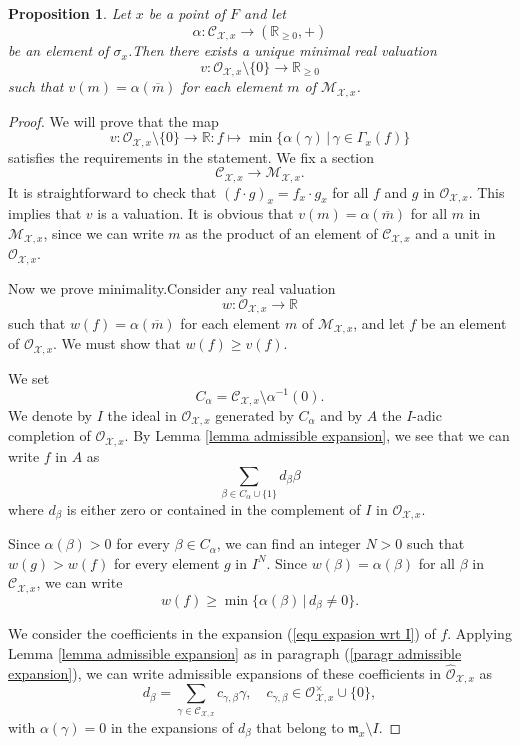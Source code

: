 \documentclass{amsart}%
\numberwithin{equation}{subsection}
\theoremstyle{plain2}
\newtheorem{prop}[equation]{Proposition}
\theoremstyle{definition2}
\theoremstyle{stepstyle}
\theoremstyle{point}
\theoremstyle{subpoint}
\newcommand{\R}{\ensuremath{\mathbb{R}}}
\newcommand{\cX}{\ensuremath{\mathscr{X}}}
\newcommand{\caC}{\ensuremath{\mathcal{C}}}
\newcommand{\caO}{\ensuremath{\mathcal{O}}}
\renewcommand{\R}{\ensuremath{\mathbb{R}}}
\begin{document}
\begin{prop}\label{prop-val}
Let $x$ be a point of $F$ and let $$\alpha:\mathcal{C}_{\cX,x}\to (\R_{\geq 0},+)$$ be an element of $\sigma_x$.Then there exists a unique minimal real valuation $$v:\mathcal{O}_{\cX,x} \setminus \{0\}\to \R_{\geq 0}$$ such that $v(m)=\alpha(\overline{m})$ for each element $m$ of $\mathcal{M}_{\cX,x}$.
\end{prop}
\begin{proof}
We will prove that the map
\begin{equation}\label{eq:val}
v:\mathcal{O}_{\cX,x} \setminus \{0\}\to \R:f\mapsto
\min\{\alpha(\gamma)\,|\,\gamma\in \Gamma_x(f)\}\end{equation}
satisfies the requirements in the statement. We fix a section $$\mathcal{C}_{\cX,x}\to \mathcal{M}_{\cX,x}.$$
It is straightforward to check that $(f\cdot g)_x=f_x\cdot g_x$ for all $f$ and $g$ in $\mathcal{O}_{\cX,x}$. This implies that $v$ is a valuation. It is obvious that
$v(m)=\alpha(\overline{m})$ for all $m$ in $\mathcal{M}_{\cX,x}$, since we can write $m$ as the product of an element of $\mathcal{C}_{\cX,x}$ and a unit in $\mathcal{O}_{\cX,x}$.

Now we prove minimality.Consider any real valuation $$w:\mathcal{O}_{\cX,x}\to \R$$ such that $w(f)=\alpha(\overline{m})$ for each element $m$ of
$\mathcal{M}_{\cX,x}$, and let $f$ be an element of
$\mathcal{O}_{\cX,x}$. We must show that $w(f)\geq v(f)$.

We set $$C_{\alpha}=\mathcal{C}_{\cX,x}\setminus \alpha^{-1}(0).$$ We denote by $I$ the ideal in $\mathcal{O}_{\cX,x}$ generated by $C_{\alpha}$ and by $A$ the $I$-adic completion of $\mathcal{O}_{\cX,x}$. By Lemma \ref{lemma admissible expansion}, we see that we can write $f$ in $A$ as \begin{equation} \label{equ expasion wrt I}
\sum_{\beta \in C_{\alpha}\cup\{1\}}d_\beta \beta
\end{equation} where $d_\beta$ is either zero or contained in the complement of $I$ in $\mathcal{O}_{\cX,x}$.

Since $\alpha(\beta)>0$ for every $\beta\in C_{\alpha}$, we can find an integer $N>0$ such that $w(g)>w(f)$ for every element $g$ in  $I^N$. Since $w(\beta)=\alpha(\beta)$ for all $\beta$ in $\mathcal{C}_{\cX,x}$, we can write $$w(f)\geq \min \{\alpha(\beta)\,|\,d_\beta \neq 0\}.$$

We consider the coefficients in the expansion (\ref{equ expasion wrt I}) of $f$. Applying Lemma \ref{lemma admissible expansion} as in paragraph (\ref{paragr admissible expansion}), we can write admissible expansions of these coefficients in $\widehat{\mathcal{O}}_{\cX,x}$ as $$d_\beta = \sum_{\gamma \in \caC_{\cX,x}}c_{\gamma, \beta} \gamma, \quad c_{\gamma, \beta} \in \caO_{\cX,x}^\times \cup \{0\},$$ with $\alpha(\gamma)=0$ in the expansions of $d_\beta$ that belong to $\mathfrak{m}_x \setminus I$. 


\end{proof}
\end{document}
